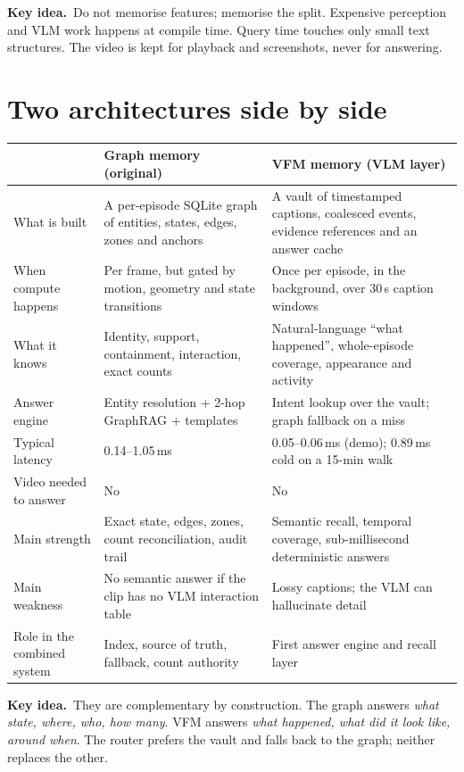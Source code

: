 \documentclass[10pt,a4paper]{article}
\newcommand{\keyidea}[1]{%
  \par\medskip\noindent\colorbox{panel}{%
    \begin{minipage}{\dimexpr\linewidth-2\fboxsep\relax}
    \vspace{2pt}\textbf{\textcolor{accent}{Key idea.}}\ #1\vspace{2pt}
    \end{minipage}}\par\medskip
}
\begin{document}
\keyidea{Do not memorise features; memorise the split. Expensive perception and VLM work happens at
compile time. Query time touches only small text structures. The video is kept for playback and
screenshots, never for answering.}

\section{Two architectures side by side}

\begin{center}
\small
\begin{tabularx}{\linewidth}{@{}l L L@{}}
\toprule
 & \textbf{Graph memory (original)} & \textbf{VFM memory (VLM layer)} \\
\midrule
What is built & A per-episode SQLite graph of entities, states, edges, zones and anchors &
A vault of timestamped captions, coalesced events, evidence references and an answer cache \\
When compute happens & Per frame, but gated by motion, geometry and state transitions &
Once per episode, in the background, over 30\,s caption windows \\
What it knows & Identity, support, containment, interaction, exact counts &
Natural-language ``what happened'', whole-episode coverage, appearance and activity \\
Answer engine & Entity resolution + 2-hop GraphRAG + templates &
Intent lookup over the vault; graph fallback on a miss \\
Typical latency & 0.14--1.05\,ms & 0.05--0.06\,ms (demo); 0.89\,ms cold on a 15-min walk \\
Video needed to answer & No & No \\
Main strength & Exact state, edges, zones, count reconciliation, audit trail &
Semantic recall, temporal coverage, sub-millisecond deterministic answers \\
Main weakness & No semantic answer if the clip has no VLM interaction table &
Lossy captions; the VLM can hallucinate detail \\
Role in the combined system & Index, source of truth, fallback, count authority &
First answer engine and recall layer \\
\bottomrule
\end{tabularx}
\end{center}

\keyidea{They are complementary by construction. The graph answers \emph{what state, where, who,
how many}. VFM answers \emph{what happened, what did it look like, around when}. The router prefers
the vault and falls back to the graph; neither replaces the other.}
\end{document}
